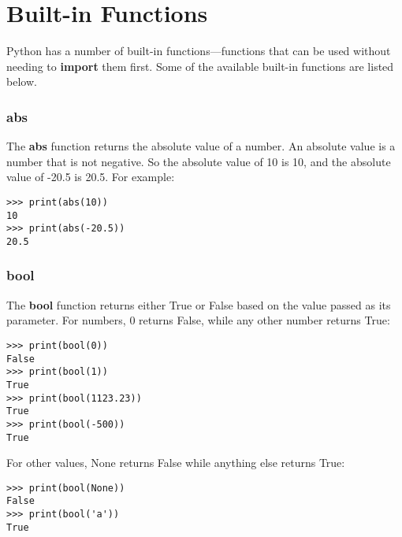 

\chapter{Built-in Functions}\label{app:builtinfunctions}

Python has a number of built-in functions---functions that can be used without needing to \textbf{import} them first.  Some of the available built-in functions are listed below.

\subsection*{abs}

The \textbf{abs} function returns the absolute value of a number.  An absolute value is a number that is not negative.  So the absolute value of 10 is 10, and the absolute value of -20.5 is 20.5.  For example:

\begin{Verbatim}[frame=single]
>>> print(abs(10))
10
>>> print(abs(-20.5))
20.5
\end{Verbatim}

\subsection*{bool}

The \textbf{bool} function returns either True or False based on the value passed as its parameter. For numbers, 0 returns False, while any other number returns True:

\begin{Verbatim}[frame=single]
>>> print(bool(0))
False
>>> print(bool(1))
True
>>> print(bool(1123.23))
True
>>> print(bool(-500))
True
\end{Verbatim}

For other values, None returns False while anything else returns True:

\begin{Verbatim}[frame=single]
>>> print(bool(None))
False
>>> print(bool('a'))
True
\end{Verbatim}

